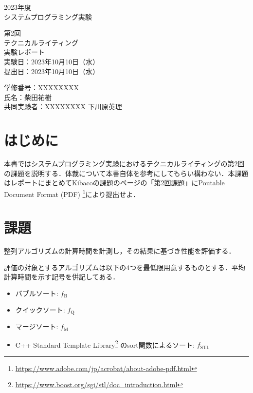 \documentclass[fleqn, a4paper. 12pt]{ltjsarticle} %
\begin{document}
    \begin{titlepage}
      \begin{center}
      {
      \Huge 2023年度\\システムプログラミング実験}
      
      \vspace{4cm}
             {\Huge 第2回\\テクニカルライティング\\
               実験レポート\\}
             \vspace{4cm}
                    {\large 実験日：2023年10月10日（水）\\提出日：2023年10月10日（水）\\}
                    
                    {\large 学修番号：XXXXXXXX\\氏名：柴田祐樹\\ 共同実験者：XXXXXXXX 下川原英理}
    \end{center}  
  \end{titlepage}
  \newcommand{\fB}{f_\mathrm{B}}
  \newcommand{\fQ}{f_\mathrm{Q}}
  \newcommand{\fM}{f_\mathrm{M}}
  \newcommand{\fSTL}{f_\mathrm{STL}}
  
    \section{はじめに}
    本書ではシステムプログラミング実験におけるテクニカルライティングの第2回の課題を説明する．体裁について本書自体を参考にしてもらい構わない．本課題はレポートにまとめてKibacoの課題のページの「第2回課題」にPoutable Document Format (PDF) \footnote{\url{https://www.adobe.com/jp/acrobat/about-adobe-pdf.html}}により提出せよ．

    \section{課題}
    整列アルゴリズムの計算時間を計測し，その結果に基づき性能を評価する．
    
    評価の対象とするアルゴリズムは以下の4つを最低限用意するものとする．平均計算時間を示す記号を併記してある．
    \begin{itemize}
        \item バブルソート: $\fB$
        \item クイックソート: $\fQ$
        \item マージソート: $\fM$
        \item C++ Standard Template Library\footnote{\url{https://www.boost.org/sgi/stl/doc_introduction.html}} のsort関数によるソート: $\fSTL$
    \end{itemize}
\end{document}
